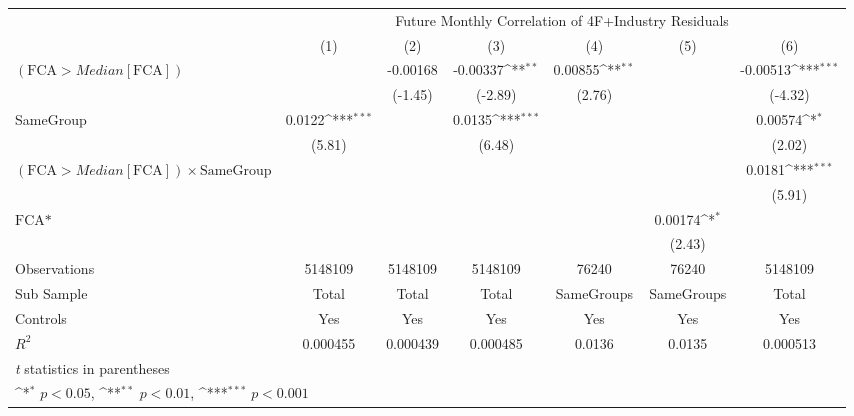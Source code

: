{
\def\sym#1{\ifmmode^{#1}\else\(^{#1}\)\fi}
\begin{tabular}{l*{6}{c}}
\hline\hline
                &\multicolumn{6}{c}{Future Monthly Correlation of 4F+Industry Residuals}                                          \\\cmidrule(lr){2-7}
                &\multicolumn{1}{c}{(1)}         &\multicolumn{1}{c}{(2)}         &\multicolumn{1}{c}{(3)}         &\multicolumn{1}{c}{(4)}         &\multicolumn{1}{c}{(5)}         &\multicolumn{1}{c}{(6)}         \\
\hline
 $ (\text{FCA} > Median[\text{FCA}]) $ &                  & -0.00168         & -0.00337\sym{**} &  0.00855\sym{**} &                  & -0.00513\sym{***}\\
                &                  &  (-1.45)         &  (-2.89)         &   (2.76)         &                  &  (-4.32)         \\
[1em]
SameGroup       &   0.0122\sym{***}&                  &   0.0135\sym{***}&                  &                  &  0.00574\sym{*}  \\
                &   (5.81)         &                  &   (6.48)         &                  &                  &   (2.02)         \\
[1em]
 $ (\text{FCA} > Median[\text{FCA}]) \times  {\text{SameGroup} }  $ &                  &                  &                  &                  &                  &   0.0181\sym{***}\\
                &                  &                  &                  &                  &                  &   (5.91)         \\
[1em]
$ \text{FCA*} $ &                  &                  &                  &                  &  0.00174\sym{*}  &                  \\
                &                  &                  &                  &                  &   (2.43)         &                  \\
\hline
Observations    &  5148109         &  5148109         &  5148109         &    76240         &    76240         &  5148109         \\
Sub Sample      &    Total         &    Total         &    Total         &SameGroups         &SameGroups         &    Total         \\
Controls        &      Yes         &      Yes         &      Yes         &      Yes         &      Yes         &      Yes         \\
$ R^2 $         & 0.000455         & 0.000439         & 0.000485         &   0.0136         &   0.0135         & 0.000513         \\
\hline\hline
\multicolumn{7}{l}{\footnotesize \textit{t} statistics in parentheses}\\
\multicolumn{7}{l}{\footnotesize \sym{*} \(p<0.05\), \sym{**} \(p<0.01\), \sym{***} \(p<0.001\)}\\
\end{tabular}
}
